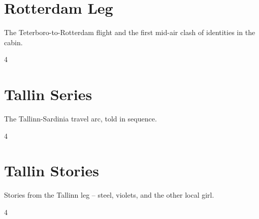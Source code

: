 \documentclass[a4paper,landscape]{memoir}
\begin{document}
\chapter{Rotterdam Leg}
The Teterboro-to-Rotterdam flight and the first mid-air clash of identities in the cabin.
\clearpage\begin{multicols*}{4} %




















\end{multicols*}

\chapter{Tallin Series}
The Tallinn-Sardinia travel arc, told in sequence.
\clearpage\begin{multicols*}{4}
\end{multicols*}

\chapter{Tallin Stories}
Stories from the Tallinn leg -- steel, violets, and the other local girl.
\clearpage\begin{multicols*}{4}
\end{multicols*}
\end{document}
